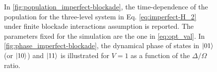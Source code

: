 \documentclass[rmp,10pt,onecolumn,fleqn,notitlepage]{revtex4-1}
\begin{document}
\begin{figure}[H]
\begin{minipage}[c]{0.49\linewidth}
\end{minipage}
\begin{minipage}[]{0.49\linewidth} \vspace{0.5cm}
\centering
{}
\end{minipage}
\caption{In \ref{fig:population_imperfect-blockade}, the time-dependence of the population for the three-level system in Eq. \eqref{eq:imperfect-H_2} under finite blockade interactions assumption is reported. The parameters fixed for the simulation are the one in \eqref{eq:opt_val}. In \ref{fig:phase_imperfect-blockade}, the dynamical phase of states in $\left\vert{01}\right\rangle$ (or $\left\vert{10}\right\rangle$) and $\left\vert{11}\right\rangle$ is illustrated for $V=1$ as a function of the $\Delta/\Omega$ ratio. }
\label{fig:population_phase_imperfect_blockade}
\end{figure}
\end{document}
